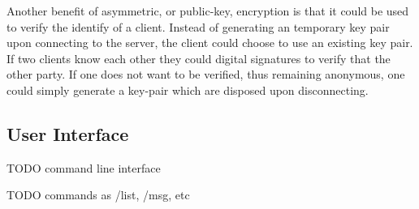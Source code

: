 Another benefit of asymmetric, or public-key, encryption is that it
could be used to verify the identify of a client. Instead of
generating an temporary key pair upon connecting to the server, the
client could choose to use an existing key pair. If two clients know
each other they could digital signatures to verify that the other
party. If one does not want to be verified, thus remaining anonymous,
one could simply generate a key-pair which are disposed upon
disconnecting.


\subsection{User Interface}
\label{sec:design-ui}
TODO command line interface

TODO commands as /list, /msg, etc
